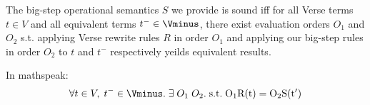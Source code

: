 \documentclass[]{article}
\begin{document}
The big-step operational semantics $S$ we provide is sound iff for all 
Verse terms $t \in V$ and all equivalent \Vminus terms $t^{-} \in \Vminus$, 
there exist evaluation orders $O_{1}$ and $O_{2}$ s.t. applying Verse 
rewrite rules $R$ in order $O_{1}$ and applying our big-step rules in order 
$O_{2}$ to $t$ and $t^{-}$ respectively yeilds equivalent results. 

In mathspeak: 
\[\forall t \in V,\; t^{-} \in \Vminus. \; 
\exists \; O_{1} \; O_{2}. \; \rm{s.t.} \;  O_{1}R(t) = O_{2}S(t')
\]
\end{document}

